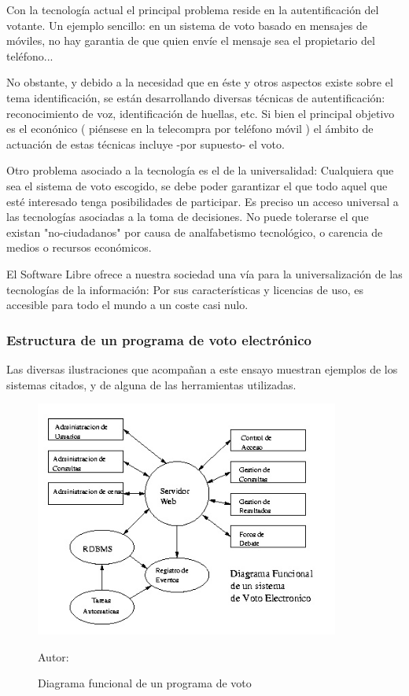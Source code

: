 Con la tecnología actual el principal problema reside en la autentificación del votante. Un ejemplo sencillo: en un sistema de voto basado en mensajes de móviles, no hay garantia de que quien envíe el mensaje sea el propietario del teléfono...

No obstante, y debido a la necesidad que en éste y otros aspectos existe sobre el tema identificación, se están desarrollando diversas técnicas de autentificación: reconocimiento de voz, identificación de huellas, etc. Si bien el principal objetivo es el econónico ( piénsese en la telecompra por teléfono móvil ) el ámbito de actuación de estas técnicas incluye -por supuesto- el voto.

Otro problema asociado a la tecnología es el de la universalidad: Cualquiera que sea el sistema de voto escogido, se debe poder garantizar el que todo aquel que esté interesado tenga posibilidades de participar. Es preciso un acceso universal a las tecnologías asociadas a la toma de decisiones. No puede tolerarse el que existan "no-ciudadanos" por causa de analfabetismo tecnológico, o carencia de medios o recursos económicos.

El Software Libre ofrece a nuestra sociedad una vía para la universalización de las tecnologías de la información: Por sus características y licencias de uso, es accesible para todo el mundo a un coste casi nulo.

\subsubsection{Estructura de un programa de voto electrónico}
Las diversas ilustraciones que acompañan a este ensayo muestran ejemplos de los sistemas citados, y de alguna de las herramientas utilizadas.

\begin{figure}[h!]
\centering
\includegraphics[width=10cm]{Figuras/funcdiag.jpg}
\caption{Diagrama funcional de un programa de voto}
Autor:  
\end{figure}

